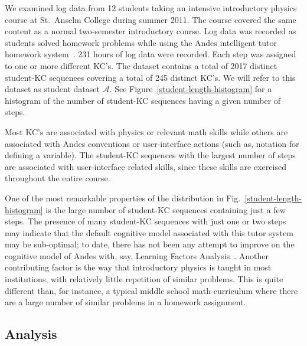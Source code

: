 \documentclass{edm_template}
\begin{document}
We examined log data from 12 students taking an intensive introductory
physics course at St.\ Anselm College during summer 2011.  The course
covered the same content as a normal two-semester introductory course.
Log data was recorded as students solved homework problems while using
the Andes intelligent tutor homework system~\cite{vanlehn_andes_2005}.  
231 hours of log data were recorded.
Each step was assigned to one or more different KC's.  The dataset
contains a total of 2017 distinct student-KC sequences covering a total of
245 distinct KC's.  We will refer to this dataset as student dataset
$\mathcal{A}$.  See Figure~\ref{student-length-histogram} for a
histogram of the number of student-KC sequences having a given number of
steps.

Most KC's are associated with physics
or relevant math skills while others are associated with 
Andes conventions or user-interface actions (such as, notation
for defining a variable).  The student-KC sequences with the largest 
number of steps are associated with user-interface related skills,
since these skills are exercised throughout the entire course. 

One of the most remarkable properties of the distribution in
Fig.~\ref{student-length-histogram} is the large number of
student-KC sequences containing just a few steps.
The presence of many student-KC sequences with just one or two
steps may indicate that the default cognitive model associated 
with this tutor system may be sub-optimal; to date, there has not 
been any attempt to improve on the cognitive model of 
Andes with, say, Learning Factors Analysis~\cite{cen_learning_2006}.
Another contributing factor is the way that introductory physics is 
taught in most institutions, with relatively little repetition of 
similar problems.  This is quite different than, for instance, 
a typical middle school math curriculum where there are a large number
of similar problems in a homework assignment.

\subsection{Analysis}
\end{document}
